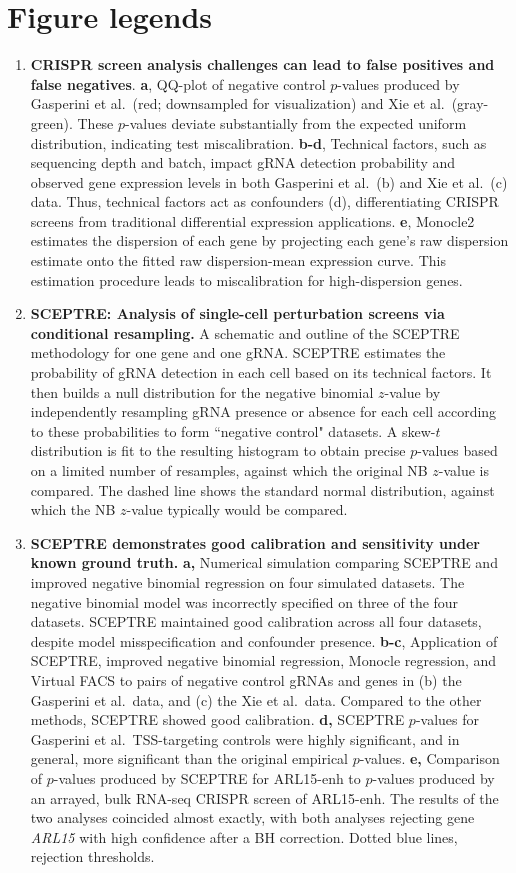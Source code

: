 \documentclass{article}
\begin{document}
\section*{Figure legends}
\begin{enumerate}
\item \textbf{CRISPR screen analysis challenges can lead to false positives and false negatives}. \textbf{a}, QQ-plot of negative control $p$-values produced by Gasperini et al.\ (red; downsampled for visualization) and Xie et al.\ (gray-green). These $p$-values deviate substantially from the expected uniform distribution, indicating test miscalibration. \textbf{b-d}, Technical factors, such as sequencing depth and batch, impact gRNA detection probability and observed gene expression levels in both Gasperini et al.\ (b) and Xie et al.\ (c) data. Thus, technical factors act as confounders (d), differentiating CRISPR screens from traditional differential expression applications. \textbf{e}, Monocle2 estimates the dispersion of each gene by projecting each gene's raw dispersion estimate onto the fitted raw dispersion-mean expression curve. This estimation procedure leads to miscalibration for high-dispersion genes.
\item \textbf{SCEPTRE: Analysis of single-cell perturbation screens via conditional resampling.} A schematic and outline of the SCEPTRE methodology for one gene and one gRNA. SCEPTRE estimates the probability of gRNA detection in each cell based on its technical factors. It then builds a null distribution for the negative binomial $z$-value by independently resampling gRNA presence or absence for each cell according to these probabilities to form ``negative control" datasets. A skew-$t$ distribution is fit to the resulting histogram to obtain precise $p$-values based on a limited number of resamples, against which the original NB $z$-value is compared. The dashed line shows the standard normal distribution, against which the NB $z$-value typically would be compared.
\item \textbf{SCEPTRE demonstrates good calibration and sensitivity under known ground truth.} \textbf{a,} Numerical simulation comparing SCEPTRE and improved negative binomial regression on four simulated datasets. The negative binomial model was incorrectly specified on three of the four datasets. SCEPTRE maintained good calibration across all four datasets, despite model misspecification and confounder presence. \textbf{b-c}, Application of SCEPTRE, improved negative binomial regression, Monocle regression, and Virtual FACS to pairs of negative control gRNAs and genes in (b) the Gasperini et al.\ data, and (c) the Xie et al.\ data. Compared to the other methods, SCEPTRE showed good calibration. \textbf{d,} SCEPTRE $p$-values for Gasperini et al.\ TSS-targeting controls were highly significant, and in general, more significant than the original empirical $p$-values. \textbf{e,} Comparison of $p$-values produced by SCEPTRE for ARL15-enh to $p$-values produced by an arrayed, bulk RNA-seq CRISPR screen of ARL15-enh. The results of the two analyses coincided almost exactly, with both analyses rejecting gene \textit{ARL15} with high confidence after a BH correction. Dotted blue lines, rejection thresholds.

\end{enumerate}
\end{document}
